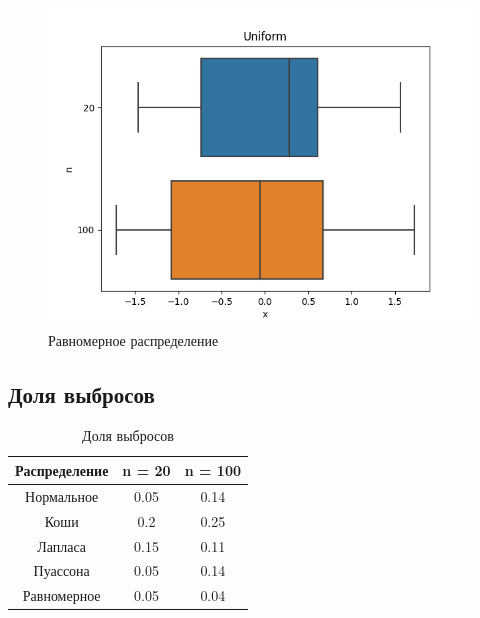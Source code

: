 \documentclass[12pt]{article}
\begin{document}
\begin{figure}
  \centering
  \includegraphics[width=0.4\paperwidth ]{images/boxplots/Uniform.png}
  \caption{Равномерное распределение}
\end{figure}

\FloatBarrier
\subsection{Доля выбросов}

\begin{table}[h!]
  \centering
  \begin{adjustbox}{width=0.5\textwidth}
    \begin{tabular}{| c | c | c |}

      \hline
      Распределение & n = 20 & n = 100 \\\hline
      Нормальное & 0.05 & 0.14 \\\hline
      Коши & 0.2 & 0.25 \\\hline
      Лапласа & 0.15 & 0.11 \\\hline
      Пуассона & 0.05 & 0.14 \\\hline
      Равномерное & 0.05 & 0.04 \\\hline
      
    \end{tabular}
  \end{adjustbox}
  \caption{Доля выбросов}
\end{table}


\FloatBarrier
\end{document}
